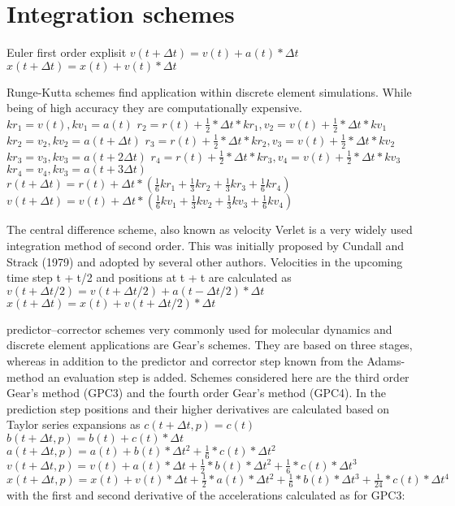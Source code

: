 \section*{Integration schemes}
Euler first order explisit
$v(t+\Delta t) = v(t) + a(t) * \Delta t $
$x(t+\Delta t) = x(t) + v(t) * \Delta t $
\par
Runge-Kutta schemes find application within discrete element simulations. While being of high
accuracy they are computationally expensive.
$kr_1 = v(t), kv_1 = a(t)$
$r_2 = r(t) + \frac{1}{2} * \Delta t * kr_1, v_2 = v(t) + \frac{1}{2} * \Delta t * kv_1$
$kr_2 = v_2, kv_2 = a(t + \Delta t)$
$r_3 = r(t) + \frac{1}{2} * \Delta t * kr_2, v_3 = v(t) + \frac{1}{2} * \Delta t * kv_2$
$kr_3 = v_3, kv_3 = a(t + 2\Delta t)$
$r_4 = r(t) + \frac{1}{2} * \Delta t * kr_3, v_4 = v(t) + \frac{1}{2} * \Delta t * kv_3$
$kr_4 = v_4, kv_3 = a(t + 3\Delta t)$
$r(t+\Delta t) = r(t) + \Delta t * (\frac{1}{6} kr_1 + \frac{1}{3} kr_2 + \frac{1}{3} kr_3 + \frac{1}{6} kr_4)$
$v(t+\Delta t) = v(t) + \Delta t * (\frac{1}{6} kv_1 + \frac{1}{3} kv_2 + \frac{1}{3} kv_3 + \frac{1}{6} kv_4)$
\par
The central difference scheme, also known as velocity Verlet is a very widely used integration
method of second order. This was initially proposed by Cundall and Strack (1979) and adopted by
several other authors. Velocities in the upcoming time step t +t/2 and positions at t +t are
calculated as
$v(t + \Delta t/2) = v(t + \Delta t/2) +a(t - \Delta t/2) * \Delta t$
$x(t + \Delta t) = x(t) +v(t + \Delta t/2) * \Delta t$
\par
predictor–corrector schemes very commonly used for molecular dynamics and discrete element
applications are Gear’s schemes. They are based on three stages, whereas in addition to the
predictor and corrector step known from the Adams-method an evaluation step is added. Schemes
considered here are the third order Gear’s method (GPC3) and the fourth order Gear’s method (GPC4).
In the prediction step positions and their higher derivatives are calculated based on Taylor series
expansions as
$c(t+\Delta t, p) = c(t)$
$b(t+\Delta t, p) = b(t) + c(t) *\Delta t$
$a(t+\Delta t, p) = a(t) + b(t) *\Delta t^2 + \frac{1}{6} * c(t) *\Delta t^2$
$v(t+\Delta t, p) = v(t) + a(t) *\Delta t + \frac{1}{2} * b(t) *\Delta t^2 + \frac{1}{6} * c(t) *\Delta t^3$
$x(t+\Delta t, p) = x(t) + v(t) * \Delta t + \frac{1}{2} * a(t) *\Delta t^2 + \frac{1}{6} * b(t) *\Delta t^3 + \frac{1}{24} * c(t) *\Delta t^4$
with the first and second derivative of the accelerations calculated as
for GPC3:
